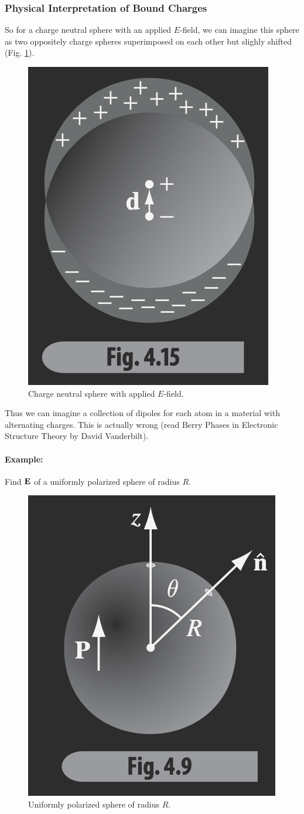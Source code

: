 \documentclass[../main.tex]{subfiles}
\begin{document}
\subsubsection{Physical Interpretation of Bound Charges}
So for a charge neutral sphere with an applied $E$-field, we can imagine this sphere as two oppositely charge spheres superimposed on each other but slighly shifted (Fig. \ref{fig:4_15}).
\begin{figure}[ht]
    \centering
    \includegraphics[width=0.3\linewidth]{fig4_15.png}
    \caption{Charge neutral sphere with applied $E$-field.}
    \label{fig:4_15}
\end{figure}
Thus we can imagine a collection of dipoles for each atom in a material with alternating charges.
This is actually wrong (read Berry Phases in Electronic Structure Theory by David Vanderbilt).

\newpage
{}
\paragraph{Example:} Find $\vb E$ of a uniformly polarized sphere of radius $R$.

\begin{figure}[ht]
    \centering
    \includegraphics[width=0.2\linewidth]{fig4_9.png}
    \caption{Uniformly polarized sphere of radius $R$.}
    \label{fig:4_9}
\end{figure}
\end{document}
